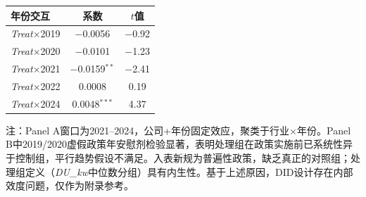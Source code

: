 \documentclass[11pt,a4paper]{article}
\begin{document}
\begin{table}[htbp]
\begin{tabular}{lcc}
\toprule
年份交互 & 系数 & $t$值 \\
\midrule
\textit{Treat}$\times$2019 & $-$0.0056 & $-$0.92 \\
\textit{Treat}$\times$2020 & $-$0.0101 & $-$1.23 \\
\textit{Treat}$\times$2021 & $-$0.0159$^{**}$ & $-$2.41 \\
\textit{Treat}$\times$2022 & 0.0008 & 0.19 \\
\textit{Treat}$\times$2024 & 0.0048$^{***}$ & 4.37 \\
\bottomrule
\end{tabular}

\vspace{6pt}
{\footnotesize 注：Panel A窗口为2021--2024，公司+年份固定效应，聚类于行业$\times$年份。Panel B中2019/2020虚假政策年安慰剂检验显著，表明处理组在政策实施前已系统性异于控制组，平行趋势假设不满足。入表新规为普遍性政策，缺乏真正的对照组；处理组定义（\textit{DU\_kw}中位数分组）具有内生性。基于上述原因，DID设计存在内部效度问题，仅作为附录参考。}
\end{table}
\end{document}
